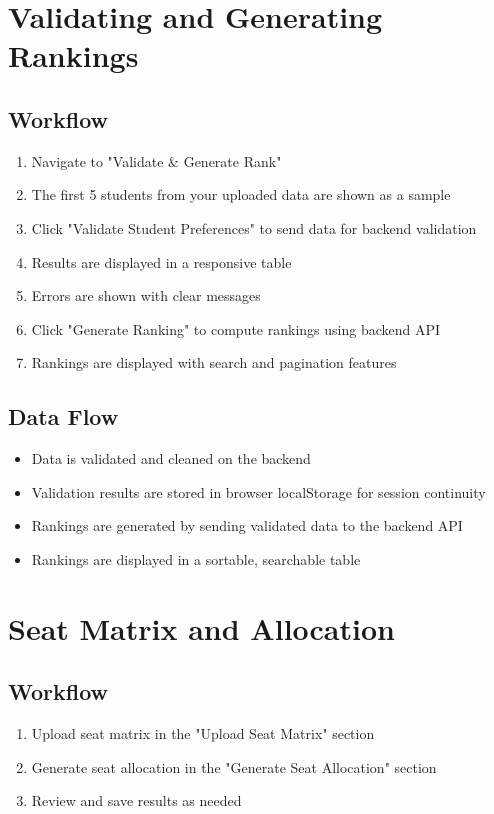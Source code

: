 \documentclass[12pt,a4paper]{article}
\begin{document}
\section{Validating and Generating Rankings}
\subsection{Workflow}
\begin{enumerate}
    \item Navigate to "Validate \& Generate Rank"
    \item The first 5 students from your uploaded data are shown as a sample
    \item Click "Validate Student Preferences" to send data for backend validation
    \item Results are displayed in a responsive table
    \item Errors are shown with clear messages
    \item Click "Generate Ranking" to compute rankings using backend API
    \item Rankings are displayed with search and pagination features
\end{enumerate}

\subsection{Data Flow}
\begin{itemize}
    \item Data is validated and cleaned on the backend
    \item Validation results are stored in browser localStorage for session continuity
    \item Rankings are generated by sending validated data to the backend API
    \item Rankings are displayed in a sortable, searchable table
\end{itemize}

\section{Seat Matrix and Allocation}
\subsection{Workflow}
\begin{enumerate}
    \item Upload seat matrix in the "Upload Seat Matrix" section
    \item Generate seat allocation in the "Generate Seat Allocation" section
    \item Review and save results as needed
\end{enumerate}
\end{document}
